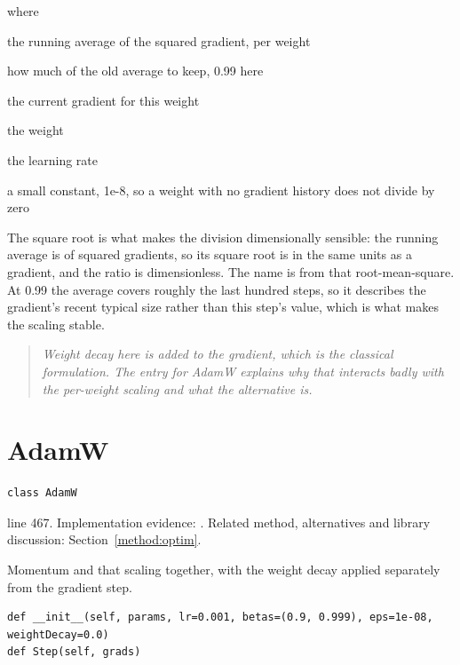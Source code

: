 \noindent where
\begin{description}[leftmargin=2.4em,style=nextline,font=\normalfont\ttfamily]\setlength\itemsep{1pt}
  \item[{$v$}] \normalfont the running average of the squared gradient, per weight
  \item[{$\alpha$}] \normalfont how much of the old average to keep, 0.99 here
  \item[{$g$}] \normalfont the current gradient for this weight
  \item[{$w$}] \normalfont the weight
  \item[{$\eta$}] \normalfont the learning rate
  \item[{$\epsilon$}] \normalfont a small constant, 1e-8, so a weight with no gradient history does not divide by zero
\end{description}
The square root is what makes the division dimensionally sensible: the running average is of squared gradients, so its square root is in the same units as a gradient, and the ratio is dimensionless. The name is from that root-mean-square. At 0.99 the average covers roughly the last hundred steps, so it describes the gradient's recent typical size rather than this step's value, which is what makes the scaling stable.


\begin{quote}\small\itshape Weight decay here is added to the gradient, which is the classical formulation. The entry for AdamW explains why that interacts badly with the per-weight scaling and what the alternative is.\end{quote}


\section{AdamW}\label{fn:train:AdamW}
\begin{lstlisting}[style=sig]
class AdamW
\end{lstlisting}
 line 467. Implementation evidence: \cite{code2026}. Related method, alternatives and library discussion: Section~\ref{method:optim}.


Momentum and that scaling together, with the weight decay applied separately from the gradient step.


\begin{lstlisting}[style=plain]
def __init__(self, params, lr=0.001, betas=(0.9, 0.999), eps=1e-08, weightDecay=0.0)
def Step(self, grads)
\end{lstlisting}


